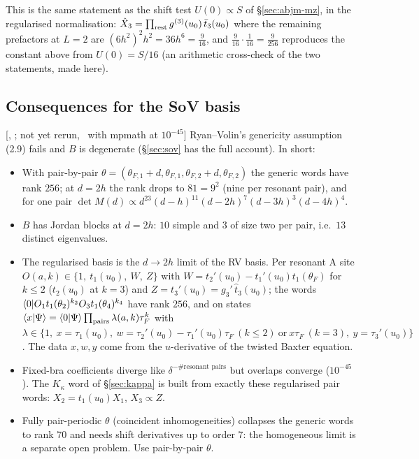 This is the same statement as the shift test $U(0)\propto S$ of \S\ref{sec:abjm-mz}, in the regularised normalisation:
$\hat X_3=\prod_{\rm rest}g^{(3)}(u_0)\,\bar t_3(u_0)$ where the remaining prefactors at $L=2$ are $(6h^2)^2h^2=36h^6=\tfrac9{16}$,
and $\tfrac9{16}\cdot\tfrac1{16}=\tfrac9{256}$ reproduces the constant above from $U(0)=S/16$ (an arithmetic cross-check of the two
statements, made here).

\subsection{Consequences for the SoV basis}\label{sec:abjm-sov}

[, ; not yet rerun, \npy\ with mpmath at $10^{-45}$] Ryan--Volin's genericity
assumption (2.9) fails and $B$ is degenerate (\S\ref{sec:sov} has the full account). In short:
\begin{itemize}
\item With pair-by-pair $\theta=(\theta_{F,1}+d,\theta_{F,1},\theta_{F,2}+d,\theta_{F,2})$ the generic words have rank $256$;
 at $d=2h$ the rank drops to $81=9^2$ (nine per resonant pair), and for one pair $\det M(d)\propto
 d^{23}(d-h)^{11}(d-2h)^7(d-3h)^3(d-4h)^4$.
\item $B$ has Jordan blocks at $d=2h$: $10$ simple and $3$ of size two per pair, i.e.\ $13$ distinct eigenvalues.
\item The regularised basis is the $d\to2h$ limit of the RV basis. Per resonant A site $O(a,k)\in\{1,\ t_1(u_0),\
 W,\ Z\}$ with $W=t_2'(u_0)-t_1'(u_0)t_1(\theta_F)$ for $k\le2$ ($t_2(u_0)$ at $k=3$) and $Z=t_3'(u_0)=g_3'\,\hat t_3(u_0)$;
 the words $\langle0|O_1t_1(\theta_2)^{k_2}O_3t_1(\theta_4)^{k_4}$ have rank $256$, and on states
 $\langle x|\Psi\rangle=\langle0|\Psi\rangle\prod_{\rm pairs}\lambda(a,k)\tau_F^k$ with $\lambda\in\{1,\ x=\tau_1(u_0),\
 w=\tau_2'(u_0)-\tau_1'(u_0)\tau_F\ (k\le2)\ \text{or}\ x\tau_F\ (k=3),\ y=\tau_3'(u_0)\}$ \npy.
 The data $x,w,y$ come from the $u$-derivative of the twisted Baxter equation.
\item Fixed-bra coefficients diverge like $\delta^{-\#\text{resonant pairs}}$ but overlaps converge ($10^{-45}$).
 The $K_\kappa$ word of \S\ref{sec:kappa} is built from exactly these regularised pair words: $X_2=t_1(u_0)X_1$, $X_3\propto Z$.
\item Fully pair-periodic $\theta$ (coincident inhomogeneities) collapses the generic words to rank $70$ and needs shift
 derivatives up to order $7$: the homogeneous limit is a separate open problem. Use pair-by-pair $\theta$.
\end{itemize}
